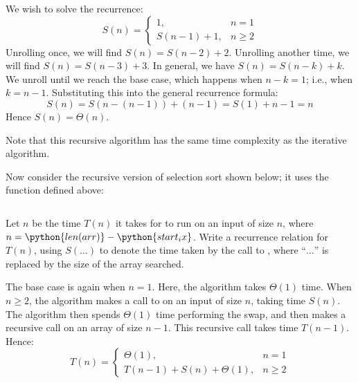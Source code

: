 \begin{prob}
\begin{subprobset}
\begin{subprob}
            \begin{soln}
                We wish to solve the recurrence:
                \[
                    S(n) = 
                    \begin{cases}
                        1,& n = 1\\
                        S(n-1) + 1,& n \geq 2
                    \end{cases}
                \]
                Unrolling once, we will find $S(n) = S(n-2) + 2$. Unrolling
                another time, we will find $S(n) = S(n-3) + 3$. In general,
                we have $S(n) = S(n-k) + k$. We unroll until we reach the base
                case, which happens when $n - k = 1$; i.e., when $k = n - 1$.
                Substituting this into the general recurrence formula:
                \[
                    S(n) = S(n-(n - 1)) + (n-1) = S(1) + n - 1 = n
                \]
                Hence $S(n) = \Theta(n)$.

                Note that this recursive algorithm has the same time complexity
                as the iterative algorithm.
            \end{soln}
        \end{subprob}
    \end{subprobset}

    Now consider the recursive version of selection sort shown below; it
    uses the  function defined above:
    \inputminted[firstline=19, lastline=25]{python}{\thisdir/include/recursive_selection_sort.py}

    \begin{subprobset}
        \begin{subprob}
            Let $n$ be the time $T(n)$ it takes for  to run
            on an input of size $n$, where $n = \python{len(arr)} - \python{start_ix}$.
            Write a recurrence relation for $T(n)$,
            using $S(\ldots)$ to denote the time taken by the call to ,
            where ``$\ldots$'' is replaced by the size of the array searched.

            \begin{soln}
                The base case is again when $n = 1$. Here, the algorithm takes
                $\Theta(1)$ time. When $n \geq 2$, the algorithm makes a call to
                 on an input of size $n$, taking time $S(n)$.
                The algorithm then spends $\Theta(1)$ time performing the swap,
                and then makes a recursive call on an array of size $n - 1$.
                This recursive call takes time $T(n-1)$. Hence:
                \[
                    T(n)
                    =
                    \begin{cases}
                        \Theta(1),& n = 1\\
                        T(n-1) + S(n) + \Theta(1),& n \geq 2
                    \end{cases}
                \]
            \end{soln}
        \end{subprob}


\end{subprobset}
\end{prob}
